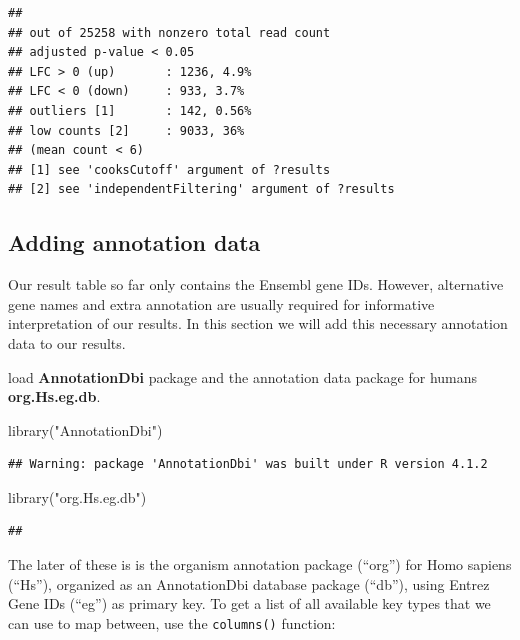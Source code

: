 \documentclass[
]{article}
\newenvironment{Shaded}{\begin{snugshade}}{\end{snugshade}}
\newcommand{\FunctionTok}[1]{\textcolor[rgb]{0.00,0.00,0.00}{#1}}
\newcommand{\NormalTok}[1]{#1}
\newcommand{\StringTok}[1]{\textcolor[rgb]{0.31,0.60,0.02}{#1}}
\begin{document}
\begin{verbatim}
## 
## out of 25258 with nonzero total read count
## adjusted p-value < 0.05
## LFC > 0 (up)       : 1236, 4.9%
## LFC < 0 (down)     : 933, 3.7%
## outliers [1]       : 142, 0.56%
## low counts [2]     : 9033, 36%
## (mean count < 6)
## [1] see 'cooksCutoff' argument of ?results
## [2] see 'independentFiltering' argument of ?results
\end{verbatim}

\hypertarget{adding-annotation-data}{%
\subsection{Adding annotation data}\label{adding-annotation-data}}

Our result table so far only contains the Ensembl gene IDs. However,
alternative gene names and extra annotation are usually required for
informative interpretation of our results. In this section we will add
this necessary annotation data to our results.

load \textbf{AnnotationDbi} package and the annotation data package for
humans \textbf{org.Hs.eg.db}.

\begin{Shaded}
\begin{Highlighting}[]
\FunctionTok{library}\NormalTok{(}\StringTok{"AnnotationDbi"}\NormalTok{)}
\end{Highlighting}
\end{Shaded}

\begin{verbatim}
## Warning: package 'AnnotationDbi' was built under R version 4.1.2
\end{verbatim}

\begin{Shaded}
\begin{Highlighting}[]
\FunctionTok{library}\NormalTok{(}\StringTok{"org.Hs.eg.db"}\NormalTok{)}
\end{Highlighting}
\end{Shaded}

\begin{verbatim}
## 
\end{verbatim}

The later of these is is the organism annotation package (``org'') for
Homo sapiens (``Hs''), organized as an AnnotationDbi database package
(``db''), using Entrez Gene IDs (``eg'') as primary key. To get a list
of all available key types that we can use to map between, use the
\texttt{columns()} function:
\end{document}
